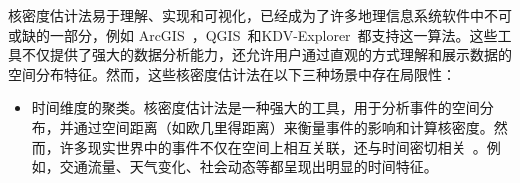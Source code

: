 核密度估计法易于理解、实现和可视化，已经成为了许多地理信息系统软件中不可或缺的一部分，例如 ArcGIS~\cite{noauthor_arcgis_nodate}，QGIS~\cite{noauthor_qgis_nodate}和KDV-Explorer~\cite{chan_kdv-explorer_2021}都支持这一算法。这些工具不仅提供了强大的数据分析能力，还允许用户通过直观的方式理解和展示数据的空间分布特征。然而，这些核密度估计法在以下三种场景中存在局限性：

\begin{itemize}[leftmargin=*]

	\item 时间维度的聚类。核密度估计法是一种强大的工具，用于分析事件的空间分布，并通过空间距离（如欧几里得距离）来衡量事件的影响和计算核密度。然而，许多现实世界中的事件不仅在空间上相互关联，还与时间密切相关~\cite{black_highway_1991}。例如，交通流量、天气变化、社会动态等都呈现出明显的时间特征。
	

\end{itemize}
